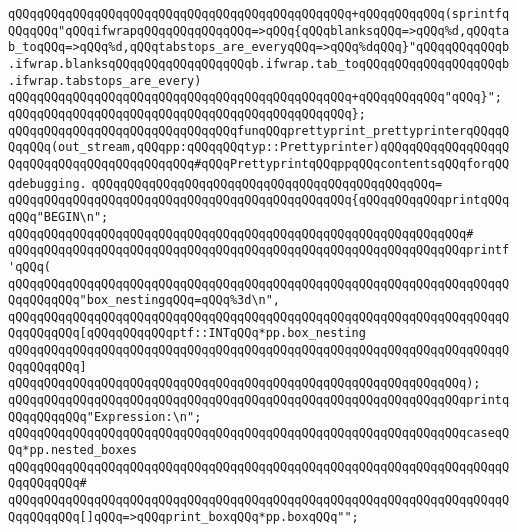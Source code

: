 \verb|qQQqqQQqqQQqqQQqqQQqqQQqqQQqqQQqqQQqqQQqqQQqqQQq+qQQqqQQqqQQq(sprintfqQQqqQQq"qQQqifwrapqQQqqQQqqQQqqQQq=>qQQq{qQQqblanksqQQq=>qQQq%d,qQQqtab_toqQQq=>qQQq%d,qQQqtabstops_are_everyqQQq=>qQQq%dqQQq}"qQQqqQQqqQQqb.ifwrap.blanksqQQqqQQqqQQqqQQqqQQqb.ifwrap.tab_toqQQqqQQqqQQqqQQqqQQqb.ifwrap.tabstops_are_every)|\newline
\verb|qQQqqQQqqQQqqQQqqQQqqQQqqQQqqQQqqQQqqQQqqQQqqQQq+qQQqqQQqqQQq"qQQq}";|\newline
\verb|qQQqqQQqqQQqqQQqqQQqqQQqqQQqqQQqqQQqqQQqqQQqqQQq};|\newline
\newline
\newline
\verb|qQQqqQQqqQQqqQQqqQQqqQQqqQQqqQQqfunqQQqprettyprint_prettyprinterqQQqqQQqqQQq(out_stream,qQQqpp:qQQqqQQqtyp::Prettyprinter)qQQqqQQqqQQqqQQqqQQqqQQqqQQqqQQqqQQqqQQqqQQq#qQQqPrettyprintqQQqppqQQqcontentsqQQqforqQQqdebugging.|\newline
\verb|qQQqqQQqqQQqqQQqqQQqqQQqqQQqqQQqqQQqqQQqqQQqqQQq=|\newline
\verb|qQQqqQQqqQQqqQQqqQQqqQQqqQQqqQQqqQQqqQQqqQQqqQQq{qQQqqQQqqQQqprintqQQqqQQq"BEGIN\n";|\newline
\verb|qQQqqQQqqQQqqQQqqQQqqQQqqQQqqQQqqQQqqQQqqQQqqQQqqQQqqQQqqQQqqQQq#|\newline
\verb|qQQqqQQqqQQqqQQqqQQqqQQqqQQqqQQqqQQqqQQqqQQqqQQqqQQqqQQqqQQqqQQqprintf'qQQq(|\newline
\verb|qQQqqQQqqQQqqQQqqQQqqQQqqQQqqQQqqQQqqQQqqQQqqQQqqQQqqQQqqQQqqQQqqQQqqQQqqQQqqQQq"box_nestingqQQq=qQQq%3d\n",|\newline
\verb|qQQqqQQqqQQqqQQqqQQqqQQqqQQqqQQqqQQqqQQqqQQqqQQqqQQqqQQqqQQqqQQqqQQqqQQqqQQqqQQq[qQQqqQQqqQQqptf::INTqQQq*pp.box_nesting|\newline
\verb|qQQqqQQqqQQqqQQqqQQqqQQqqQQqqQQqqQQqqQQqqQQqqQQqqQQqqQQqqQQqqQQqqQQqqQQqqQQqqQQq]|\newline
\verb|qQQqqQQqqQQqqQQqqQQqqQQqqQQqqQQqqQQqqQQqqQQqqQQqqQQqqQQqqQQqqQQq);|\newline
\newline
\verb|qQQqqQQqqQQqqQQqqQQqqQQqqQQqqQQqqQQqqQQqqQQqqQQqqQQqqQQqqQQqqQQqprintqQQqqQQqqQQq"Expression:\n";|\newline
\newline
\verb|qQQqqQQqqQQqqQQqqQQqqQQqqQQqqQQqqQQqqQQqqQQqqQQqqQQqqQQqqQQqqQQqcaseqQQq*pp.nested_boxes|\newline
\verb|qQQqqQQqqQQqqQQqqQQqqQQqqQQqqQQqqQQqqQQqqQQqqQQqqQQqqQQqqQQqqQQqqQQqqQQqqQQqqQQq#|\newline
\verb|qQQqqQQqqQQqqQQqqQQqqQQqqQQqqQQqqQQqqQQqqQQqqQQqqQQqqQQqqQQqqQQqqQQqqQQqqQQqqQQq[]qQQq=>qQQqprint_boxqQQq*pp.boxqQQq"";|\newline

